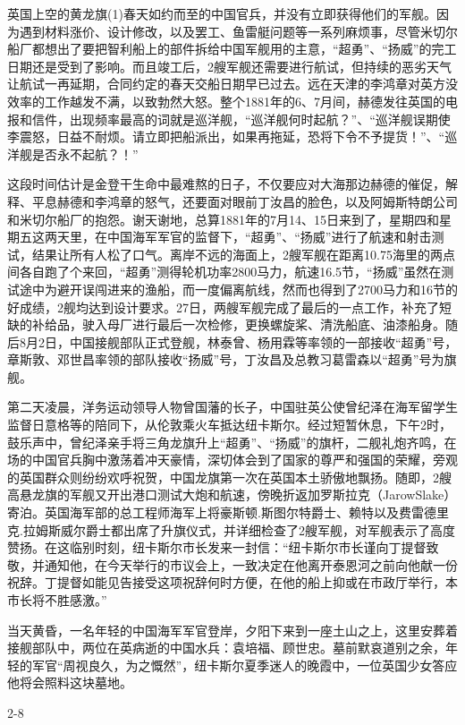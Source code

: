 \documentclass[12pt,UTF8]{ctexbook}
\begin{document}
英国上空的黄龙旗(1)春天如约而至的中国官兵，并没有立即获得他们的军舰。因为遇到材料涨价、设计修改，以及罢工、鱼雷艇问题等一系列麻烦事，尽管米切尔船厂都想出了要把智利船上的部件拆给中国军舰用的主意，“超勇”、“扬威”的完工日期还是受到了影响。而且竣工后，2艘军舰还需要进行航试，但持续的恶劣天气让航试一再延期，合同约定的春天交船日期早已过去。远在天津的李鸿章对英方没效率的工作越发不满，以致勃然大怒。整个1881年的6、7月间，赫德发往英国的电报和信件，出现频率最高的词就是巡洋舰，“巡洋舰何时起航？”、“巡洋舰误期使李震怒，日益不耐烦。请立即把船派出，如果再拖延，恐将下令不予提货！”、“巡洋舰是否永不起航？！”

这段时间估计是金登干生命中最难熬的日子，不仅要应对大海那边赫德的催促，解释、平息赫德和李鸿章的怒气，还要面对眼前丁汝昌的脸色，以及阿姆斯特朗公司和米切尔船厂的抱怨。谢天谢地，总算1881年的7月14、15日来到了，星期四和星期五这两天里，在中国海军军官的监督下，“超勇”、“扬威”进行了航速和射击测试，结果让所有人松了口气。离岸不远的海面上，2艘军舰在距离10.75海里的两点间各自跑了个来回，“超勇”测得轮机功率2800马力，航速16.5节，“扬威”虽然在测试途中为避开误闯进来的渔船，而一度偏离航线，然而也得到了2700马力和16节的好成绩，2舰均达到设计要求。27日，两艘军舰完成了最后的一点工作，补充了短缺的补给品，驶入母厂进行最后一次检修，更换螺旋桨、清洗船底、油漆船身。随后8月2日，中国接舰部队正式登舰，林泰曾、杨用霖等率领的一部接收“超勇”号，章斯敦、邓世昌率领的部队接收“扬威”号，丁汝昌及总教习葛雷森以“超勇”号为旗舰。

第二天凌晨，洋务运动领导人物曾国藩的长子，中国驻英公使曾纪泽在海军留学生监督日意格等的陪同下，从伦敦乘火车抵达纽卡斯尔。经过短暂休息，下午2时，鼓乐声中，曾纪泽亲手将三角龙旗升上“超勇”、“扬威”的旗杆，二舰礼炮齐鸣，在场的中国官兵胸中激荡着冲天豪情，深切体会到了国家的尊严和强国的荣耀，旁观的英国群众则纷纷欢呼祝贺，中国龙旗第一次在英国本土骄傲地飘扬。随即，2艘高悬龙旗的军舰又开出港口测试大炮和航速，傍晚折返加罗斯拉克（JarowSlake）寄泊。英国海军部的总工程师海军上将豪斯顿.斯图尔特爵士、赖特以及费雷德里克.拉姆斯威尔爵士都出席了升旗仪式，并详细检查了2艘军舰，对军舰表示了高度赞扬。在这临别时刻，纽卡斯尔市长发来一封信：“纽卡斯尔市长谨向丁提督致敬，并通知他，在今天举行的市议会上，一致决定在他离开泰恩河之前向他献一份祝辞。丁提督如能见告接受这项祝辞何时方便，在他的船上抑或在市政厅举行，本市长将不胜感激。”

当天黄昏，一名年轻的中国海军军官登岸，夕阳下来到一座土山之上，这里安葬着接舰部队中，两位在英病逝的中国水兵：袁培福、顾世忠。墓前默哀道别之余，年轻的军官“周视良久，为之慨然”，纽卡斯尔夏季迷人的晚霞中，一位英国少女答应他将会照料这块墓地。

2-8
\end{document}
